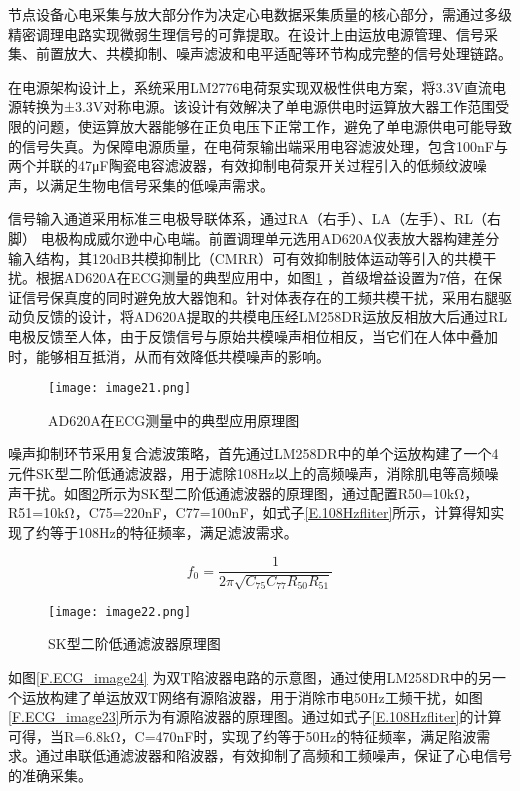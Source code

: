 节点设备心电采集与放大部分作为决定心电数据采集质量的核心部分，需通过多级精密调理电路实现微弱生理信号的可靠提取。在设计上由运放电源管理、信号采集、前置放大、共模抑制、噪声滤波和电平适配等环节构成完整的信号处理链路。

在电源架构设计上，系统采用LM2776电荷泵实现双极性供电方案，将3.3V直流电源转换为±3.3V对称电源。该设计有效解决了单电源供电时运算放大器工作范围受限的问题，使运算放大器能够在正负电压下正常工作，避免了单电源供电可能导致的信号失真。为保障电源质量，在电荷泵输出端采用电容滤波处理，包含100nF与两个并联的47μF陶瓷电容滤波器，有效抑制电荷泵开关过程引入的低频纹波噪声，以满足生物电信号采集的低噪声需求。

信号输入通道采用标准三电极导联体系，通过RA（右手）、LA（左手）、RL（右脚） 电极构成威尔逊中心电端。前置调理单元选用AD620A仪表放大器构建差分输入结构，其120dB共模抑制比（CMRR）可有效抑制肢体运动等引入的共模干扰。根据AD620A在ECG测量的典型应用中，如图\ref{F.ECG_image21} \cite{AD620A}，首级增益设置为7倍，在保证信号保真度的同时避免放大器饱和。针对体表存在的工频共模干扰，采用右腿驱动负反馈的设计，将AD620A提取的共模电压经LM258DR运放反相放大后通过RL电极反馈至人体，由于反馈信号与原始共模噪声相位相反，当它们在人体中叠加时，能够相互抵消，从而有效降低共模噪声的影响。

\begin{figure}[H]
    \centering
    \texttt{[image: image21.png]}
    \caption{AD620A在ECG测量中的典型应用原理图}
    \label{F.ECG_image21}
\end{figure}


噪声抑制环节采用复合滤波策略，首先通过LM258DR中的单个运放构建了一个4元件SK型二阶低通滤波器，用于滤除108Hz以上的高频噪声，消除肌电等高频噪声干扰。如图\ref{F.ECG_image22}所示为SK型二阶低通滤波器的原理图，通过配置R50=10kΩ，R51=10kΩ，C75=220nF，C77=100nF，如式子\ref{E.108Hzfliter}所示，计算得知实现了约等于108Hz的特征频率，满足滤波需求。

\begin{equation}
    f_{0}=\frac{1}{2 \pi \sqrt{C_{75} C_{77} R_{50} R_{51}}}
\label{E.108Hzfliter}
\end{equation}

\begin{figure}[hbt]
    \centering
    \texttt{[image: image22.png]}
    \caption{SK型二阶低通滤波器原理图}
    \label{F.ECG_image22}
\end{figure}

如图\ref{F.ECG_image24} \cite{新概念模拟电路3}为双T陷波器电路的示意图，通过使用LM258DR中的另一个运放构建了单运放双T网络有源陷波器，用于消除市电50Hz工频干扰，如图\ref{F.ECG_image23}所示为有源陷波器的原理图。通过如式子\ref{E.108Hzfliter}的计算可得，当R=6.8kΩ，C=470nF时，实现了约等于50Hz的特征频率，满足陷波需求。通过串联低通滤波器和陷波器，有效抑制了高频和工频噪声，保证了心电信号的准确采集。

